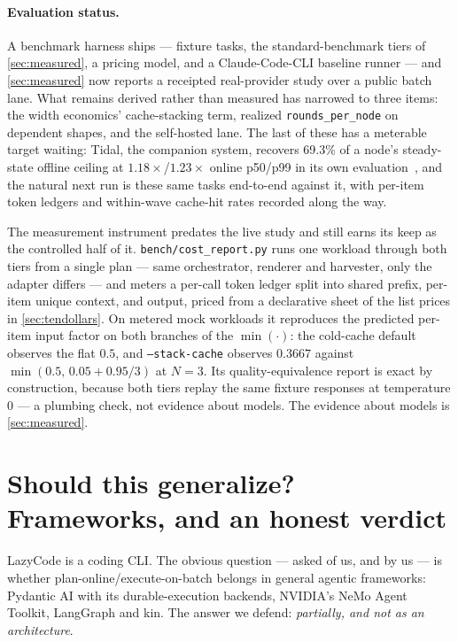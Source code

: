 \documentclass[11pt]{article}
\begin{document}
\paragraph{Evaluation status.} A benchmark harness ships --- fixture tasks, the standard-benchmark tiers of \cref{sec:measured}, a pricing model, and a Claude-Code-CLI baseline runner --- and \cref{sec:measured} now reports a receipted real-provider study over a public batch lane. What remains derived rather than measured has narrowed to three items: the width economics' cache-stacking term, realized \texttt{rounds\_per\_node} on dependent shapes, and the self-hosted lane. The last of these has a meterable target waiting: Tidal, the companion system, recovers 69.3\% of a node's steady-state offline ceiling at $1.18\times$/$1.23\times$ online p50/p99 in its own evaluation~\cite{tidal}, and the natural next run is these same tasks end-to-end against it, with per-item token ledgers and within-wave cache-hit rates recorded along the way.

{\sloppy
The measurement instrument predates the live study and still earns its keep as the controlled half of it. \texttt{bench/cost\_report.py} runs one workload through both tiers from a single plan --- same orchestrator, renderer and harvester, only the adapter differs --- and meters a per-call token ledger split into shared prefix, per-item unique context, and output, priced from a declarative sheet of the list prices in \cref{sec:tendollars}. On metered mock workloads it reproduces the predicted per-item input factor on both branches of the $\min(\cdot)$: the cold-cache default observes the flat $0.5$, and \texttt{--stack-cache} observes $0.3667$ against $\min(0.5,\,0.05{+}0.95/3)$ at $N{=}3$. Its quality-equivalence report is exact by construction, because both tiers replay the same fixture responses at temperature 0 --- a plumbing check, not evidence about models. The evidence about models is \cref{sec:measured}.\par}

\section{Should this generalize? Frameworks, and an honest verdict}
\label{sec:generalization}

LazyCode is a coding CLI. The obvious question --- asked of us, and by us --- is whether plan-online/execute-on-batch belongs in general agentic frameworks: Pydantic AI with its durable-execution backends, NVIDIA's NeMo Agent Toolkit, LangGraph and kin. The answer we defend: \emph{partially, and not as an architecture}.
\end{document}
